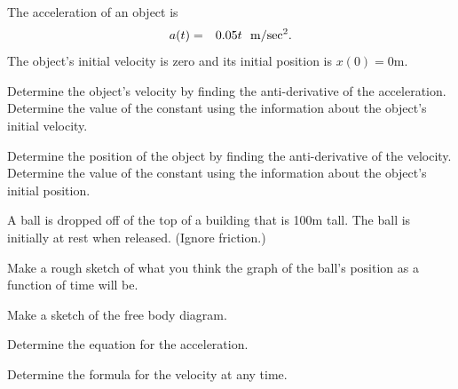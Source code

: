 
\begin{problem}
\item The acceleration of an object is
\begin{eqnarray*}
  a(t) & = & 0.05 t ~~ \mathrm{m/sec\textsuperscript{2}}.
\end{eqnarray*}
The object's initial velocity is zero and its initial position is $x(0)=0$m.
  \begin{subproblem}
  \item Determine the object's velocity by finding the anti-derivative
    of the acceleration.  Determine the value of the constant using
    the information about the object's initial velocity.

    \vfill
    
  \item Determine the position of the object by finding the
    anti-derivative of the velocity.  Determine the value of the
    constant using the information about the object's initial position.
        
    \vfill
  \end{subproblem}

  \clearpage

\item A ball is dropped off of the top of a building that is 100m
  tall. The ball is initially at rest when released. (Ignore friction.)
  \begin{subproblem}
  \item Make a rough sketch of what you think the graph of the ball's
    position as a function of time will be. 

      \vfill

    \item Make a sketch of the free body diagram.
      \vfill

    \item Determine the equation for the acceleration.
      \vspace{10em}


    \item Determine the formula for the velocity at any time.
      \vfill

  \end{subproblem}

\end{problem}



